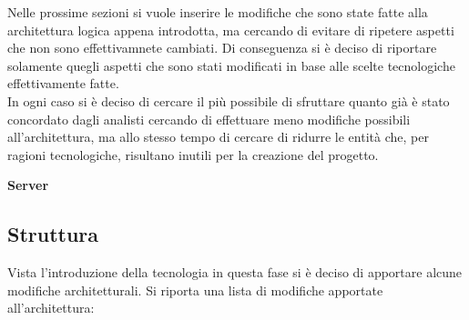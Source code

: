 Nelle prossime sezioni si vuole inserire le modifiche che sono state fatte alla architettura logica appena introdotta, ma cercando di evitare di ripetere aspetti che non sono effettivamnete cambiati. Di conseguenza si \`e deciso di riportare solamente quegli aspetti che sono stati modificati in base alle scelte tecnologiche effettivamente fatte.\\
In ogni caso si \`e deciso di cercare il pi\`u possibile di sfruttare quanto gi\`a \`e stato concordato dagli analisti cercando di effettuare meno modifiche possibili all'architettura, ma allo stesso tempo di cercare di ridurre le entit\`a che, per ragioni tecnologiche, risultano inutili per la creazione del progetto.

\begin{center}
  \textbf{Server}
\end{center}

\subsection{Struttura}

Vista l'introduzione della tecnologia in questa fase si \`e deciso di apportare alcune modifiche architetturali. Si riporta una lista di modifiche apportate all'architettura:

